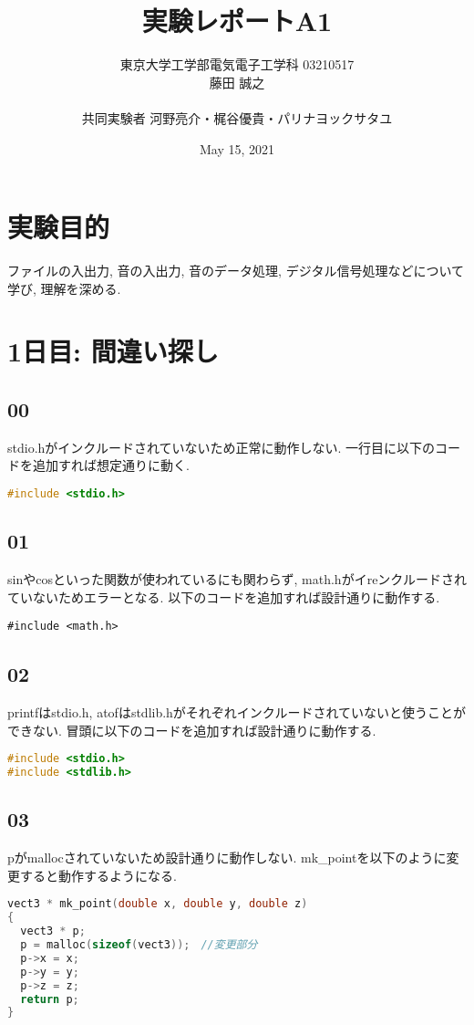 \documentclass{ltjsarticle}
\title{実験レポートA1}
\author{東京大学工学部電気電子工学科 03210517\\藤田 誠之\\~\\ 共同実験者  河野亮介・梶谷優貴・パリナヨックサタユ}
\date{May 15, 2021}
\begin{document}
\maketitle
\section{実験目的}
ファイルの入出力, 音の入出力, 音のデータ処理, デジタル信号処理などについて学び, 理解を深める. 
\section{1日目: 間違い探し}
\subsection{00}
stdio.hがインクルードされていないため正常に動作しない. 一行目に以下のコードを追加すれば想定通りに動く. 
\begin{lstlisting}[caption=p00.c 変更部分,language=C]
#include <stdio.h>
\end{lstlisting}
\subsection{01}
sinやcosといった関数が使われているにも関わらず, math.hがイreンクルードされていないためエラーとなる. 以下のコードを追加すれば設計通りに動作する. 
\begin{lstlisting}[caption=p01.c 変更部分language=C]
#include <math.h>
\end{lstlisting}
\subsection{02}
printfはstdio.h, atofはstdlib.hがそれぞれインクルードされていないと使うことができない. 冒頭に以下のコードを追加すれば設計通りに動作する. 
\begin{lstlisting}[caption=p02.c 変更部分,language=C]
#include <stdio.h>
#include <stdlib.h>
\end{lstlisting}

\subsection{03}
pがmallocされていないため設計通りに動作しない. mk\_pointを以下のように変更すると動作するようになる. 

\begin{lstlisting}[caption=p03.c 変更部分,language=C]
vect3 * mk_point(double x, double y, double z)
{
  vect3 * p;
  p = malloc(sizeof(vect3));　//変更部分
  p->x = x;
  p->y = y;
  p->z = z;
  return p;
}
\end{lstlisting}
\end{document}
